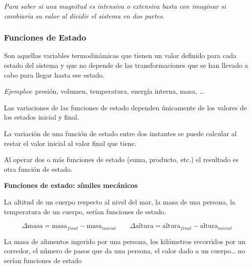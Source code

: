 \documentclass[
  spanish,
]{article}
\begin{document}
\emph{Para saber si una magnitud es intensiva o extensiva basta con
imaginar si cambiaría su valor al dividir el sistema en dos partes.}

\hypertarget{funciones-de-estado}{%
\subsubsection{Funciones de Estado}\label{funciones-de-estado}}

\hfill{}

Son aquellas variables termodinámicas que tienen un valor definido para
cada estado del sistema y que no depende de las transformaciones que se
han llevado a cabo para llegar hasta ese estado.

\emph{Ejemplos}: presión, volumen, temperatura, energía interna, masa,
\ldots{}

Las variaciones de las funciones de estado dependen únicamente de los
valores de los estados inicial y final.

La variación de una función de estado entre dos instantes se puede
calcular al restar el valor inicial al valor final que tiene.

Al operar dos o más funciones de estado (suma, producto, etc.) el
resultado es otra función de estado.

\textbf{Funciones de estado: símiles mecánicos}

La altitud de un cuerpo respecto al nivel del mar, la masa de una
persona, la temperatura de un cuerpo, serían funciones de estado.

\[\Delta \text{masa} = \text{masa}_{final} - \text{masa}_{inicial} \qquad \Delta \text{altura} = \text{altura}_{final} - \text{altura}_{inicial}\]

La masa de alimentos ingerido por una persona, los kilómetros recorridos
por un corredor, el número de pasos que da una persona, el calor dado a
un cuerpo\ldots{} no serían funciones de estado
\end{document}
